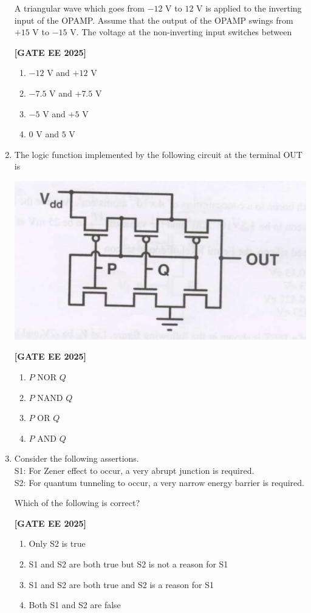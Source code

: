 \documentclass[12pt]{article}
\begin{document}
\begin{enumerate}[leftmargin=*, label=\textbf{Q.\arabic*:}]
A triangular wave which goes from $-12$ V to $12$ V is applied to the inverting input of the OPAMP. Assume that the output of the OPAMP swings from $+15$ V to $-15$ V. The voltage at the non-inverting input switches between
 
\noindent \textbf{[GATE EE 2025]}
\begin{enumerate}
    \item $-12$ V and $+12$ V
    \item $-7.5$ V and $+7.5$ V
    \item $-5$ V and $+5$ V
    \item $0$ V and $5$ V
\end{enumerate}

\item The logic function implemented by the following circuit at the terminal OUT is
\begin{center}
\includegraphics[width=0.6\columnwidth]{figs/q54.png}
\end{center}
 
\noindent \textbf{[GATE EE 2025]}
\begin{enumerate}
    \item $P$ NOR $Q$
    \item $P$ NAND $Q$
    \item $P$ OR $Q$
    \item $P$ AND $Q$
\end{enumerate}

\item Consider the following assertions. \\
S1: For Zener effect to occur, a very abrupt junction is required. \\
S2: For quantum tunneling to occur, a very narrow energy barrier is required.

Which of the following is correct?
 
\noindent \textbf{[GATE EE 2025]}
\begin{enumerate}
    \item Only S2 is true
    \item S1 and S2 are both true but S2 is not a reason for S1
    \item S1 and S2 are both true and S2 is a reason for S1
    \item Both S1 and S2 are false
\end{enumerate}


\end{enumerate}
\end{document}
